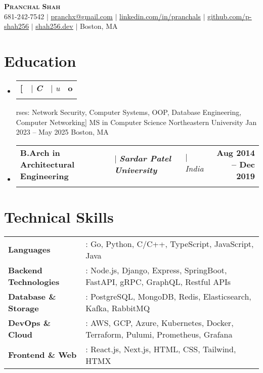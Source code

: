 \message{ !name(main.tex)}\documentclass[letterpaper,11pt]{article}
\makeatletter
\newcommand{\sectionspace}{\vspace{-15pt}}
\newcommand{\itemspace}{\vspace{-10pt}}
\newcommand{\eduItem}[5][]{
    \item
    \begin{tabular*}{\textwidth}
        {l@{\hspace{4pt}}l@{\hspace{4pt}}l@{\extracolsep{\fill}}r}
        \textbf{#2} & $|$ \textbf{\textit{#3}} & $|$ \textit{#5} & \textbf{#4} \\
        \ifx&#1&%
        \else
            \multicolumn{4}{l}{\small#1}
        \fi
    \end{tabular*}
    \itemspace
}
\newcommand{\sectionStart}{
    \begin{itemize}[
        leftmargin=0pt,
        label={},
    ]
}
\newcommand{\sectionEnd}{
    \end{itemize}
    \sectionspace
}
\makeatother
\begin{document}

\begin{center}
    \textbf{\Huge \scshape Pranchal Shah} \\
    \vspace{1pt}
    \small 681-242-7542 $|$
    \href{mailto:x@x.com}{\underline{pranchx@gmail.com}} $|$
    \href{https://linkedin.com/in/pranchals}{\underline{linkedin.com/in/pranchals}} $|$
    \href{https://github.com/p-shah256}{\underline{github.com/p-shah256}} $|$
    \href{https://shah256.dev}{\underline{shah256.dev}} $|$
    \small Boston, MA
\end{center}

\section{Education}
\sectionStart
    \eduItem
        [Courses: Network Security, Computer Systems, OOP, Database Engineering, Computer Networking]
        {MS in Computer Science}
        {Northeastern University}
        {Jan 2023 -- May 2025}
        {Boston, MA}
    \eduItem
        {B.Arch in Architectural Engineering}
        {Sardar Patel University}
        {Aug 2014 -- Dec 2019}
        {India}
\sectionEnd

\section{Technical Skills}
\begin{tabular*}{\textwidth}{l@{\hspace{10pt}}l}
    \textbf{\small Languages} & \small : Go, Python, C/C++, TypeScript, JavaScript, Java \\
    \textbf{\small Backend Technologies} & \small : Node.js, Django, Express, SpringBoot, FastAPI, gRPC, GraphQL, Restful APIs \\
    \textbf{\small Database \& Storage} & \small : PostgreSQL, MongoDB, Redis, Elasticsearch, Kafka, RabbitMQ \\
    \textbf{\small DevOps \& Cloud} & \small : AWS, GCP, Azure, Kubernetes, Docker, Terraform, Pulumi, Prometheus, Grafana \\
    \textbf{\small Frontend \& Web} & \small : React.js, Next.js, HTML, CSS, Tailwind, HTMX \\
\end{tabular*}
\end{document}
